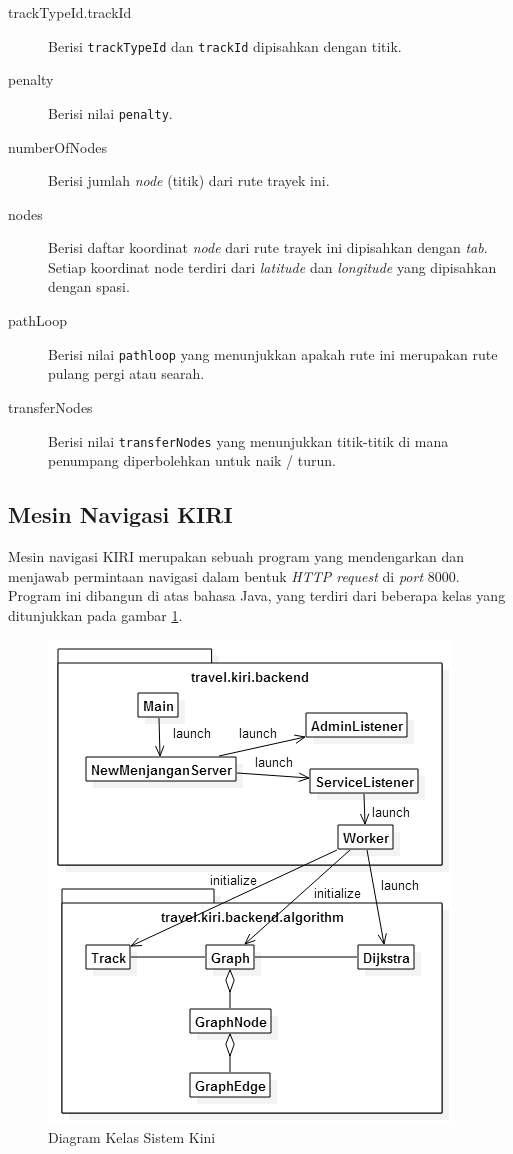 \begin{description}
	\item[trackTypeId.trackId] Berisi \verb/trackTypeId/ dan \verb/trackId/ dipisahkan dengan titik.
	\item[penalty] Berisi nilai \verb/penalty/.
	\item[numberOfNodes] Berisi jumlah \textit{node} (titik) dari rute trayek ini.
	\item[nodes] Berisi daftar koordinat \textit{node} dari rute trayek ini dipisahkan dengan \textit{tab}. Setiap koordinat node terdiri dari \textit{latitude} dan \textit{longitude} yang dipisahkan dengan spasi.
	\item[pathLoop] Berisi nilai \verb/pathloop/ yang menunjukkan apakah rute ini merupakan rute pulang pergi atau searah.
	\item[transferNodes] Berisi nilai \verb/transferNodes/ yang menunjukkan titik-titik di mana penumpang diperbolehkan untuk naik / turun.
\end{description}

\subsection{Mesin Navigasi KIRI}

Mesin navigasi KIRI merupakan sebuah program yang mendengarkan dan menjawab permintaan navigasi dalam bentuk \textit{HTTP request} di \textit{port} 8000. Program ini dibangun di atas bahasa Java, yang terdiri dari beberapa kelas yang ditunjukkan pada gambar \ref{fig:2_diagram_kelas_sistem_kini}.

\begin{figure}
	\centering
	\includegraphics[scale=0.5]{Gambar/2_diagram_kelas_sistem_kini}
	\caption{Diagram Kelas Sistem Kini} 
	\label{fig:2_diagram_kelas_sistem_kini}
\end{figure}

